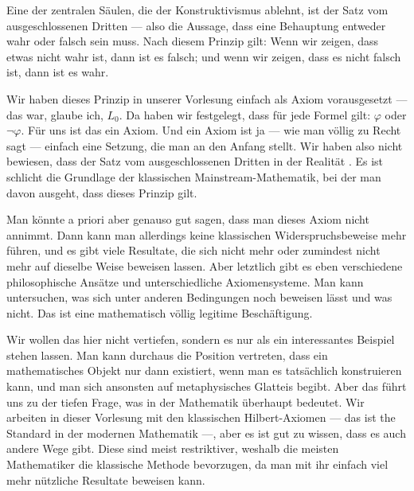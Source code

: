 \begin{spoken-clean}[00:03:12 - 00:04:41]
Eine der zentralen Säulen, die der Konstruktivismus ablehnt, ist der Satz vom ausgeschlossenen Dritten --- also die Aussage, dass eine Behauptung entweder wahr oder falsch sein muss. Nach diesem Prinzip gilt: Wenn wir zeigen, dass etwas nicht wahr ist, dann ist es falsch; und wenn wir zeigen, dass es nicht falsch ist, dann ist es wahr.

Wir haben dieses Prinzip in unserer Vorlesung einfach als Axiom vorausgesetzt --- das war, glaube ich, $L_0$. Da haben wir festgelegt, dass für jede Formel gilt: $\varphi$ oder $\neg\varphi$. Für uns ist das ein Axiom. Und ein Axiom ist ja --- wie man völlig zu Recht sagt --- einfach eine Setzung, die man an den Anfang stellt. Wir haben also nicht bewiesen, dass der Satz vom ausgeschlossenen Dritten in der Realität . Es ist schlicht die Grundlage der klassischen Mainstream-Mathematik, bei der man davon ausgeht, dass dieses Prinzip gilt.

Man könnte a priori aber genauso gut sagen, dass man dieses Axiom nicht annimmt. Dann kann man allerdings keine klassischen Widerspruchsbeweise mehr führen, und es gibt viele Resultate, die sich nicht mehr oder zumindest nicht mehr auf dieselbe Weise beweisen lassen. Aber letztlich gibt es eben verschiedene philosophische Ansätze und unterschiedliche Axiomensysteme. Man kann untersuchen, was sich unter anderen Bedingungen noch beweisen lässt und was nicht. Das ist eine mathematisch völlig legitime Beschäftigung.

Wir wollen das hier nicht vertiefen, sondern es nur als ein interessantes Beispiel stehen lassen. Man kann durchaus die Position vertreten, dass ein mathematisches Objekt nur dann existiert, wenn man es tatsächlich konstruieren kann, und man sich ansonsten auf metaphysisches Glatteis begibt. Aber das führt uns zu der tiefen Frage, was  in der Mathematik überhaupt bedeutet. Wir arbeiten in dieser Vorlesung mit den klassischen Hilbert-Axiomen --- das ist the Standard in der modernen Mathematik ---, aber es ist gut zu wissen, dass es auch andere Wege gibt. Diese sind meist restriktiver, weshalb die meisten Mathematiker die klassische Methode bevorzugen, da man mit ihr einfach viel mehr nützliche Resultate beweisen kann.
\end{spoken-clean}

\begin{math-stroke}
\end{math-stroke}

